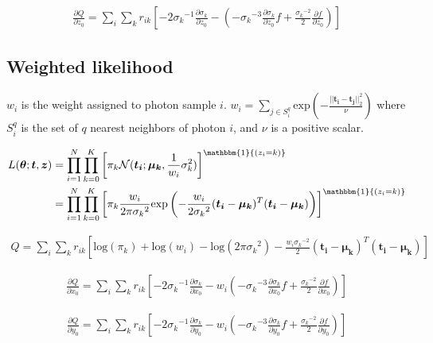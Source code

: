 \begin{align} \label{eqn:dz_no_weight}
\frac{\partial Q}{\partial z_0} = \sum_i \sum_k r_{ik} \left[ -2{\sigma_k}^{-1}\frac{\partial \sigma_k}{\partial z_0} - \left( -{\sigma_k}^{-3} \frac{\partial \sigma_k}{\partial z_0}f + \frac{{\sigma_k}^{-2}}{2} \frac{\partial f}{\partial z_0}  \right) \right] 
\end{align}


\subsection{Weighted likelihood} \label{sec:weighted_like}

$w_i$ is the weight assigned to photon sample $i$.
$w_i = \sum\limits_{j \in S_i^q} \text{exp} \left( -\frac{||\bm{t_i}-\bm{t_j}||_2^2}{\nu} \right)$
where $S_i^q$ is the set of $q$ nearest neighbors of photon $i$, and $\nu$ is a 
positive scalar.

\begin{align}
L(\bm{\theta};\bm{t},\bm{z}) &= \prod_{i=1}^N \prod_{k=0}^K \left[ \pi_k \mathcal{N}(\bm{t_i};\bm{\mu_k},\frac{1}{w_i}\sigma_k^2) \right]^{\mathbbm{1}{(z_i=k)}} \\
&= \prod_{i=1}^N \prod_{k=0}^K \left[ \pi_k \frac{w_i}{2\pi{\sigma_k}^2} \text{exp}\left( -\frac{w_i}{2{\sigma_k}^2} (\bm{t_i}-\bm{\mu_k})^T(\bm{t_i}-\bm{\mu_k}) \right) \right]^{\mathbbm{1}{(z_i=k)}}
\end{align}

\begin{align}
Q = \sum_i \sum_k r_{ik} \left[ \text{log}(\pi_k) + \text{log}(w_i) - \text{log}(2\pi{\sigma_k}^2) - \frac{w_i{\sigma_k}^{-2}}{2}(\bm{t_i}-\bm{\mu_k})^T(\bm{t_i}-\bm{\mu_k}) \right]
\end{align}

\begin{align}
\frac{\partial Q}{\partial x_0} = \sum_i \sum_k r_{ik} \left[ -2{\sigma_k}^{-1}\frac{\partial \sigma_k}{\partial x_0} - w_i\left( -{\sigma_k}^{-3} \frac{\partial \sigma_k}{\partial x_0}f + \frac{{\sigma_k}^{-2}}{2} \frac{\partial f}{\partial x_0}  \right) \right] 
\end{align}

\begin{align}
\frac{\partial Q}{\partial y_0} = \sum_i \sum_k r_{ik} \left[ -2{\sigma_k}^{-1}\frac{\partial \sigma_k}{\partial y_0} - w_i\left( -{\sigma_k}^{-3} \frac{\partial \sigma_k}{\partial y_0}f + \frac{{\sigma_k}^{-2}}{2} \frac{\partial f}{\partial y_0}  \right) \right] 
\end{align}

